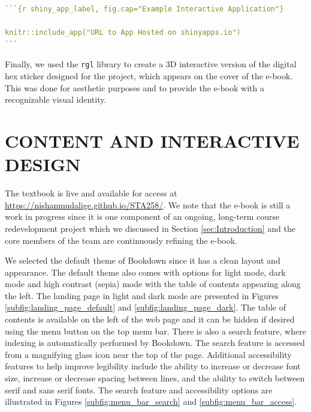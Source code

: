 \documentclass[11pt]{article}
\begin{document}
\begin{lstlisting}[language=R,
                   caption={An example of a code block in Markdown used to render an image with ggplot},
                   label={lst:Markdown_shiny},
                   captionpos=b] 
```{r shiny_app_label, fig.cap="Example Interactive Application"}

knitr::include_app("URL to App Hosted on shinyapps.io")
```
\end{lstlisting}

Finally, we used the \texttt{rgl} library to create a 3D interactive version of the digital hex sticker designed for the project, which appears on the cover of the e-book.
This was done for aesthetic purposes and to provide the e-book with a recognizable visual identity.


\section{CONTENT AND INTERACTIVE DESIGN}

The textbook is live and available for access at \href{https://nishanmudalige.github.io/STA258/}{https://nishanmudalige.github.io/STA258/}.
We note that the e-book is still a work in progress since it is one component of an ongoing, long-term course redevelopment project which we discussed in Section \ref{sec:Introduction} and the core members of the team are continuously refining the e-book.

We selected the default theme of Bookdown since it has a clean layout and appearance.
The default theme also comes with options for light mode, dark mode and high contrast (sepia) mode with the table of contents appearing along the left.
The landing page in light and dark mode are presented in Figures \ref{subfig:landing_page_default} and \ref{subfig:landing_page_dark}.
The table of contents is available on the left of the web page and it can be hidden if desired using the menu button on the top menu bar.
There is also a search feature, where indexing is automatically performed by Bookdown. The search feature is accessed from a magnifying glass icon near the top of the page.
Additional accessibility features to help improve legibility include the ability to increase or decrease font size, increase or decrease spacing between lines, and the ability to switch between serif and sans serif fonts. The search feature and accessibility options are illustrated in Figures \ref{subfig:menu_bar_search} and \ref{subfig:menu_bar_access}.
\end{document}
